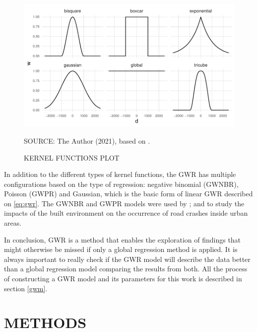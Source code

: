\begin{figure}[!htbp]
    \centering\footnotesize
    \captionsetup{font=footnotesize}
    \caption{KERNEL FUNCTIONS PLOT}
    \includegraphics{fig/kernel.pdf}
    \label{fig:kernel}
    \par SOURCE: The Author (2021), based on \textcite{Gollini2013}.
\end{figure}

In addition to the different types of kernel functions, the GWR has multiple configurations based on the type of regression: negative binomial (GWNBR), Poisson (GWPR) and Gaussian, which is the basic form of linear GWR described on  \autoref{eq:gwr}. The GWNBR and GWPR models were used by \textcite{Obelheiro2019}; \textcite{Obelheiro2020} and \textcite{Yu2017} to study the impacts of the built environment on the occurrence of road crashes inside urban areas. %

In conclusion, GWR is a method that enables the exploration of findings that might otherwise be missed if only a global regression method is applied. It is always important to really check if the GWR model will describe the data better than a global regression model comparing the results from both. All the process of constructing a GWR model and its parameters for this work is described in section \ref{gwm}.


\chapter{METHODS}

